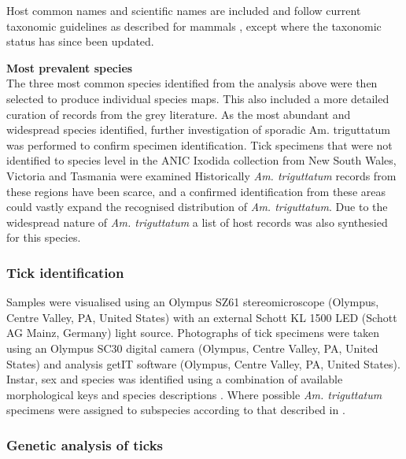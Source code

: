 \documentclass[a4paper, nobind]{templates/ociamthesis}
\begin{document}
Host common names and scientific names are included and follow current taxonomic guidelines as described for mammals \autocite{jacksonTaxonomyAustralianMammals2015}, except where the taxonomic status has since been updated.

\textbf{Most prevalent species}\\
The three most common species identified from the analysis above were then selected to produce individual species maps.
This also included a more detailed curation of records from the grey literature.
As the most abundant and widespread species identified, further investigation of sporadic Am. triguttatum was performed to confirm specimen identification.
Tick specimens that were not identified to species level in the ANIC Ixodida collection from New South Wales, Victoria and Tasmania were examined Historically \emph{Am. triguttatum} records from these regions have been scarce, and a confirmed identification from these areas could vastly expand the recognised distribution of \emph{Am. triguttatum}.
Due to the widespread nature of \emph{Am. triguttatum} a list of host records was also synthesied for this species.

\hypertarget{tick-identification}{%
\subsubsection{Tick identification}\label{tick-identification}}

Samples were visualised using an Olympus SZ61 stereomicroscope (Olympus, Centre Valley, PA, United States) with an external Schott KL 1500 LED (Schott AG Mainz, Germany) light source.
Photographs of tick specimens were taken using an Olympus SC30 digital camera (Olympus, Centre Valley, PA, United States) and analysis getIT software (Olympus, Centre Valley, PA, United States).
Instar, sex and species was identified using a combination of available morphological keys and species descriptions \autocite{robertsAustralianTicks1970,jacksonMorphologicalComparisonAdult2002,laanObservationsBiologyDistribution2011,barkerTicksAustraliaSpecies2014,kwakPhylogeneticAnalysisAustralian2017}.
Where possible \emph{Am. triguttatum} specimens were assigned to subspecies according to that described in \textcite{robertsStatusMorphologicallyDivergent1962}.

\hypertarget{genetic-analysis-of-ticks}{%
\subsubsection{Genetic analysis of ticks}\label{genetic-analysis-of-ticks}}
\end{document}
